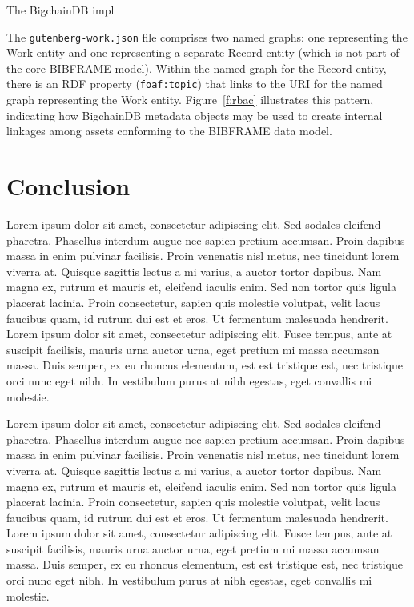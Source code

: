 The BigchainDB impl


The \verb|gutenberg-work.json| file comprises two
named graphs: one representing the Work entity and one representing a
separate Record entity (which is not part of the core BIBFRAME model).
Within the named graph for the Record entity, there is an RDF property
(\verb|foaf:topic|) that links to the URI for the named graph representing
the Work entity. Figure~\ref{f:rbac} illustrates this pattern, indicating
how BigchainDB metadata objects may be used to create internal linkages
among assets conforming to the BIBFRAME data model.

\section{Conclusion}
Lorem ipsum dolor sit amet, consectetur adipiscing elit. Sed sodales
eleifend pharetra. Phasellus interdum augue nec sapien pretium accumsan.
Proin dapibus massa in enim pulvinar facilisis. Proin venenatis nisl metus,
nec tincidunt lorem viverra at. Quisque sagittis lectus a mi varius, a
auctor tortor dapibus. Nam magna ex, rutrum et mauris et, eleifend iaculis
enim. Sed non tortor quis ligula placerat lacinia. Proin consectetur, sapien
quis molestie volutpat, velit lacus faucibus quam, id rutrum dui est et
eros. Ut fermentum malesuada hendrerit. Lorem ipsum dolor sit amet,
consectetur adipiscing elit. Fusce tempus, ante at suscipit facilisis,
mauris urna auctor urna, eget pretium mi massa accumsan massa. Duis semper,
ex eu rhoncus elementum, est est tristique est, nec tristique orci nunc eget
nibh. In vestibulum purus at nibh egestas, eget convallis mi molestie.

Lorem ipsum dolor sit amet, consectetur adipiscing elit. Sed sodales
eleifend pharetra. Phasellus interdum augue nec sapien pretium accumsan.
Proin dapibus massa in enim pulvinar facilisis. Proin venenatis nisl metus,
nec tincidunt lorem viverra at. Quisque sagittis lectus a mi varius, a
auctor tortor dapibus. Nam magna ex, rutrum et mauris et, eleifend iaculis
enim. Sed non tortor quis ligula placerat lacinia. Proin consectetur, sapien
quis molestie volutpat, velit lacus faucibus quam, id rutrum dui est et
eros. Ut fermentum malesuada hendrerit. Lorem ipsum dolor sit amet,
consectetur adipiscing elit. Fusce tempus, ante at suscipit facilisis,
mauris urna auctor urna, eget pretium mi massa accumsan massa. Duis semper,
ex eu rhoncus elementum, est est tristique est, nec tristique orci nunc eget
nibh. In vestibulum purus at nibh egestas, eget convallis mi molestie.

